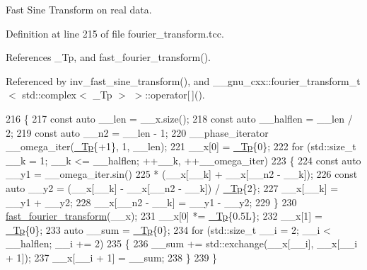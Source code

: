 Fast Sine Transform on real data. 

Definition at line 215 of file fourier\+\_\+transform.\+tcc.



References \+\_\+\+Tp, and fast\+\_\+fourier\+\_\+transform().



Referenced by inv\+\_\+fast\+\_\+sine\+\_\+transform(), and \+\_\+\+\_\+gnu\+\_\+cxx\+::fourier\+\_\+transform\+\_\+t$<$ std\+::complex$<$ \+\_\+\+Tp $>$ $>$\+::operator\mbox{[}$\,$\mbox{]}().


\begin{DoxyCode}
216     \{
217       \textcolor{keyword}{const} \textcolor{keyword}{auto} \_\_len = \_\_x.size();
218       \textcolor{keyword}{const} \textcolor{keyword}{auto} \_\_halflen = \_\_len / 2;
219       \textcolor{keyword}{const} \textcolor{keyword}{auto} \_\_n2 = \_\_len - 1;
220       \_\_phase\_iterator \_\_omega\_iter(\hyperlink{namespace____gnu__cxx_a3b19a9c800ca194374ef9172290f7d79}{\_Tp}\{+1\}, 1, \_\_len);
221       \_\_x[0] = \hyperlink{namespace____gnu__cxx_a3b19a9c800ca194374ef9172290f7d79}{\_Tp}\{0\};
222       \textcolor{keywordflow}{for} (std::size\_t \_\_k = 1; \_\_k <= \_\_halflen; ++\_\_k, ++\_\_omega\_iter)
223         \{
224           \textcolor{keyword}{const} \textcolor{keyword}{auto} \_\_y1 = \_\_omega\_iter.sin()
225                           * (\_\_x[\_\_k] + \_\_x[\_\_n2 - \_\_k]);
226           \textcolor{keyword}{const} \textcolor{keyword}{auto} \_\_y2 = (\_\_x[\_\_k] - \_\_x[\_\_n2 - \_\_k]) / \hyperlink{namespace____gnu__cxx_a3b19a9c800ca194374ef9172290f7d79}{\_Tp}\{2\};
227           \_\_x[\_\_k] = \_\_y1 + \_\_y2;
228           \_\_x[\_\_n2 - \_\_k] = \_\_y1 - \_\_y2;
229         \}
230       \hyperlink{namespace____gnu__cxx_a64fbc0765e55d7466a21baa9f652362e}{fast\_fourier\_transform}(\_\_x);
231       \_\_x[0] *= \hyperlink{namespace____gnu__cxx_a3b19a9c800ca194374ef9172290f7d79}{\_Tp}\{0.5L\};
232       \_\_x[1] = \hyperlink{namespace____gnu__cxx_a3b19a9c800ca194374ef9172290f7d79}{\_Tp}\{0\};
233       \textcolor{keyword}{auto} \_\_sum = \hyperlink{namespace____gnu__cxx_a3b19a9c800ca194374ef9172290f7d79}{\_Tp}\{0\};
234       \textcolor{keywordflow}{for} (std::size\_t \_\_i = 2; \_\_i < \_\_halflen; \_\_i += 2)
235         \{
236           \_\_sum += std::exchange(\_\_x[\_\_i], \_\_x[\_\_i + 1]);
237           \_\_x[\_\_i + 1] = \_\_sum;
238         \}
239     \}
\end{DoxyCode}
\mbox{\label{namespace____gnu__cxx_ad851cfdb017da1c6a6466f982d591a52}} 
